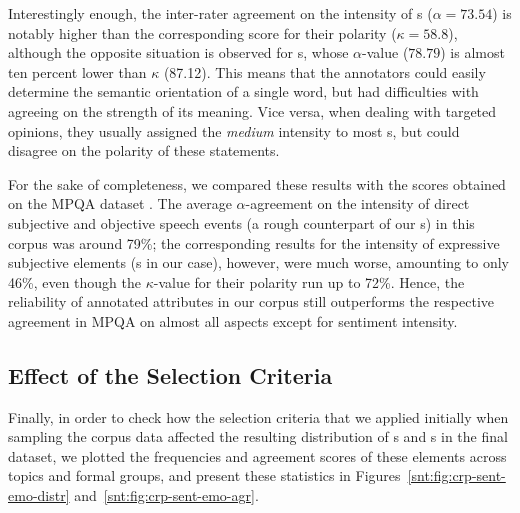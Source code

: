 Interestingly enough, the inter-rater agreement on the intensity of
s ($\alpha = 73.54$) is notably higher than the
corresponding score for their polarity ($\kappa = 58.8$), although the
opposite situation is observed for s, whose
$\alpha$-value ($78.79$) is almost ten percent lower than $\kappa$
(87.12).  This means that the annotators could easily determine the
semantic orientation of a single word, but had difficulties with
agreeing on the strength of its meaning.  Vice versa, when dealing
with targeted opinions, they usually assigned the \emph{medium}
intensity to most s, but could disagree on the
polarity of these statements.

For the sake of completeness, we compared these results with the
scores obtained on the MPQA dataset \cite[see][pp. 38, 80]{Wilson:07}.
The average $\alpha$-agreement on the intensity of direct subjective
and objective speech events (a rough counterpart of our
s) in this corpus was around 79\%; the
corresponding results for the intensity of expressive subjective
elements (s in our case), however, were much
worse, amounting to only 46\%, even though the $\kappa$-value for
their polarity run up to 72\%.  Hence, the reliability of annotated
attributes in our corpus still outperforms the respective agreement in
MPQA on almost all aspects except for sentiment intensity.


\subsection{Effect of the Selection Criteria}\label{subsec:eval-selection-criteria}

Finally, in order to check how the selection criteria that we applied
initially when sampling the corpus data affected the resulting
distribution of s and s in
the final dataset, we plotted the frequencies and agreement scores of
these elements across topics and formal groups, and present these
statistics in Figures~\ref{snt:fig:crp-sent-emo-distr}
and~\ref{snt:fig:crp-sent-emo-agr}.

